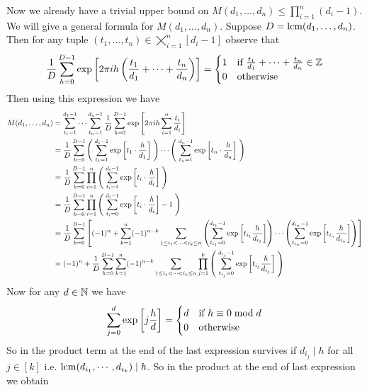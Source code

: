 Now we already have a trivial upper bound on $M(d_1,\dots, d_n)\leq \prod_{i=1}^n (d_i-1)$. We will give a general formula for $M(d_1,\dots, d_n)$. Suppose $D=\operatorname{lcm}(d_1,\dots, d_n)$. Then for any tuple $(t_1,\dots, t_n)\in \bigtimes_{i=1}^n[d_i-1]$ observe that  \begin{equation}\label{eq:integrality-exponential-sum}
  \frac1D\sum_{h=0}^{D-1}\exp\left[2\pi ih\left(\frac{t_1}{d_1}+\cdots+\frac{t_n}{d_n}\right)\right]=\begin{cases}
    1 & \text{if $\frac{t_1}{d_1}+\cdots+\frac{t_n}{d_n}\in\mathbb{Z}$}\\ 
    0 & \text{otherwise}
  \end{cases}
\end{equation}
Then using this expression we have \begin{align*}
  M(d_1,\dots, d_n) & = \sum_{t_1=1}^{d_1-1}\cdots \sum_{t_n=1}^{d_n-1}\frac1D\sum_{h=0}^{D-1}\exp\left[2\pi ih\sum_{i=1}^n\frac{t_i}{d_i}\right]\\ 
    & = \frac1D\sum_{h=0}^{D-1} \left(\;\sum_{t_1=1}^{d_1-1}\exp\left[t_1\cdot \frac{h}{d_1}\right]\;\right)\cdots \left(\;\sum_{t_n=1}^{d_n-1}\exp\left[t_n\cdot \frac{h}{d_n}\right]\;\right)\\ 
    & = \frac1D\sum_{h=0}^{D-1}\prod_{i=1}^n \left(\;\sum_{t_i=1}^{d_i-1}\exp\left[t_i\cdot \frac{h}{d_i}\right]\;\right)\\ 
    & = \frac1D\sum_{h=0}^{D-1}\prod_{i=1}^n \left(\;\sum_{t_i=0}^{d_i-1}\exp\left[t_i\cdot \frac{h}{d_i}\right]-1\;\right)\\ 
    & = \frac1D\sum_{h=0}^{D-1}\left[ (-1)^n+\sum_{k=1}^n(-1)^{n-k}\sum_{1\leq i_1<\cdots <i_k\leq n}\left( \sum_{t_{i_1}=0}^{d_{i_1}-1}\exp\left[ t_{i_1}\frac{h}{d_{i_1}} \right] \right)\cdots   \left( \sum_{t_{i_n}=0}^{d_{i_n}-1}\exp\left[ t_{i_n}\frac{h}{d_{i_n}} \right] \right) \right]\\ 
    & = (-1)^n+\frac1D\sum_{h=0}^{D-1} \sum_{k=1}^n(-1)^{n-k}\sum_{1\leq i_1<\cdots <i_k\leq n}\prod_{j=1}^k\left(\; \sum_{t_{i_j}=0}^{d_{i_j}-1}\exp\left[ t_{i_j}\frac{h}{d_{i_j}} \right]\; \right)
\end{align*}
Now for any $d\in\mathbb{N}$ we have $$\sum_{j=0}^d\exp\left[j\frac{h}d\right]=\begin{cases}
  d & \text{if $h\equiv 0\bmod d$}\\ 
  0 & \text{otherwise}
\end{cases}$$So in the product term at the end of the last expression survives if $d_{i_j}\mid h$ for all $j\in[k]$ i.e. $\operatorname{lcm}(d_{i_1},\cdots, d_{i_k})\mid h$. So in the product at the end of last expression we obtain 
